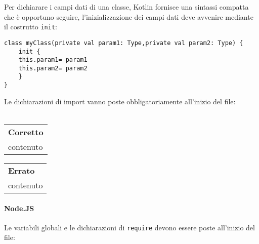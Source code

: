 Per dichiarare i campi dati di una classe, Kotlin fornisce una sintassi compatta che è opportuno seguire, l'inizializzazione dei campi dati deve avvenire mediante il costrutto \texttt{init}:

\begin{lstlisting}
class myClass(private val param1: Type,private val param2: Type) {	
	init {
	this.param1= param1
	this.param2= param2	
	} 
}
\end{lstlisting}

Le dichiarazioni di import vanno poste obbligatoriamente all'inizio del file:\\\\
\begin{minipage}{0.45\textwidth}
	\begin{tabular}{p{\textwidth}}	
		\textbf{Corretto}
		\begin{lstlisting}
		import java.util.*
		
		class example() {
		\\contenuto
		}
		\end{lstlisting}
	\end{tabular}
\end{minipage}
\hfill
\begin{minipage}{0.45\textwidth}
	\begin{tabular}{|p{\textwidth}}		
		\textbf{Errato}
		\begin{lstlisting}
		class example {
		\\contenuto
		}
		
		import java.util.*
		\end{lstlisting}
	\end{tabular}
	
\end{minipage}

\paragraph{Node.JS}
Le variabili globali e le dichiarazioni di \texttt{require} devono essere poste all'inizio del file:\\


